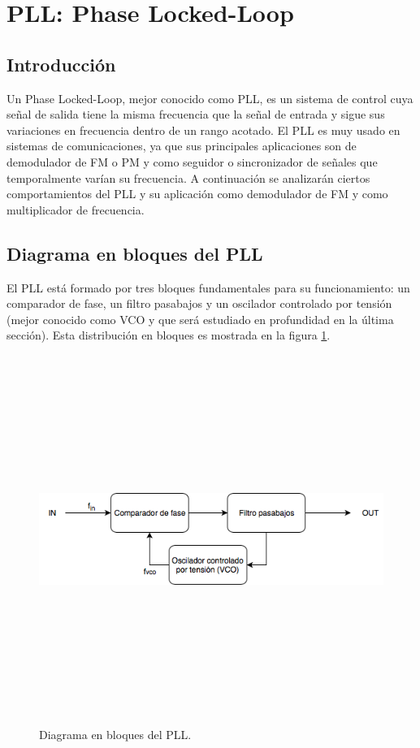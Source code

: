 \section{PLL: Phase Locked-Loop}

\subsection{Introducci\'on}

Un Phase Locked-Loop, mejor conocido como PLL, es un sistema de control cuya se\~nal de salida tiene la misma frecuencia que la se\~nal de entrada y sigue sus variaciones en frecuencia dentro de un rango acotado. El PLL es muy usado en sistemas de comunicaciones, ya que sus principales aplicaciones son de demodulador de FM o PM y como seguidor o sincronizador de se\~nales que temporalmente var\'ian su frecuencia. A continuaci\'on se analizar\'an ciertos comportamientos del PLL y su aplicaci\'on como demodulador de FM y como multiplicador de frecuencia.

\subsection{Diagrama en bloques del PLL}

El PLL est\'a formado por tres bloques fundamentales para su funcionamiento: un comparador de fase, un filtro pasabajos y un oscilador controlado por tensi\'on (mejor conocido como VCO y que ser\'a estudiado en profundidad en la \'ultima secci\'on). Esta distribuci\'on en bloques es mostrada en la figura \ref{pll}.

\begin{figure}[H] %
	\centering
	\includegraphics[width=12cm,height=12cm,keepaspectratio]{../EJ2/imagenes/PLL.png}
	\caption{Diagrama en bloques del PLL.}
	\label{pll}
\end{figure}

